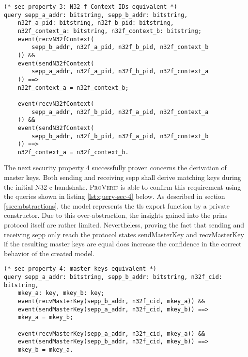 \begin{lstlisting}[caption={Query for security property 3},label={lst:query-sec-3},firstnumber=317]
(* sec property 3: N32-f Context IDs equivalent *)
query sepp_a_addr: bitstring, sepp_b_addr: bitstring,
    n32f_a_pid: bitstring, n32f_b_pid: bitstring,
    n32f_context_a: bitstring, n32f_context_b: bitstring;
    event(recvN32fContext(
        sepp_b_addr, n32f_a_pid, n32f_b_pid, n32f_context_b
    )) &&
    event(sendN32fContext(
        sepp_a_addr, n32f_a_pid, n32f_b_pid, n32f_context_a
    )) ==>
    n32f_context_a = n32f_context_b;

    event(recvN32fContext(
        sepp_a_addr, n32f_b_pid, n32f_a_pid, n32f_context_a
    )) &&
    event(sendN32fContext(
        sepp_b_addr, n32f_b_pid, n32f_a_pid, n32f_context_b
    )) ==>
    n32f_context_a = n32f_context_b.
\end{lstlisting}

The next security property 4 successfully proven concerns the derivation of master keys.
Both sending and receiving \gls{sepp} shall derive matching keys during the initial N32-c handshake.
\textsc{ProVerif} is able to confirm this requirement using the queries shown in listing \ref{lst:query-sec-4} below.
As described in section \ref{ssec:abstractions}, the model represents the \gls{tls} export function by a private constructor.
Due to this over-abstraction, the insights gained into the \gls{prins} protocol itself are rather limited.
Nevertheless, proving the fact that sending and receiving \gls{sepp} only reach the protocol states {\sffamily sendMasterKey} and {\sffamily recvMasterKey} if the resulting master keys are equal does increase the confidence in the correct behavior of the created model.

\begin{lstlisting}[caption={Query for security property 4},label={lst:query-sec-4},firstnumber=337]
(* sec property 4: master keys equivalent *)
query sepp_a_addr: bitstring, sepp_b_addr: bitstring, n32f_cid: bitstring,
    mkey_a: key, mkey_b: key;
    event(recvMasterKey(sepp_b_addr, n32f_cid, mkey_a)) &&
    event(sendMasterKey(sepp_a_addr, n32f_cid, mkey_b)) ==>
    mkey_a = mkey_b;

    event(recvMasterKey(sepp_a_addr, n32f_cid, mkey_a)) &&
    event(sendMasterKey(sepp_b_addr, n32f_cid, mkey_b)) ==>
    mkey_b = mkey_a.
\end{lstlisting}


